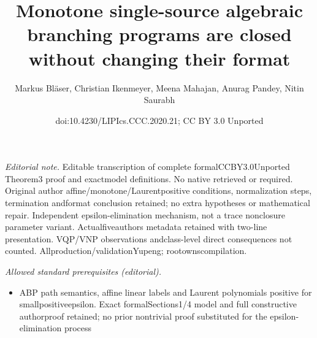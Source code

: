 \documentclass[10pt,a4paper]{article}
\title{Monotone single-source algebraic branching programs are closed without changing their format}
\author{Markus Bläser, Christian Ikenmeyer, Meena Mahajan, Anurag Pandey, Nitin Saurabh}
\date{doi:10.4230/LIPIcs.CCC.2020.21; CC BY 3.0 Unported}
\begin{document}
\maketitle
\noindent\textit{Editorial note.} Editable transcription of complete formalCCBY3.0Unported Theorem3 proof and exactmodel definitions. No native retrieved or required. Original author affine/monotone/Laurentpositive conditions, normalization steps, termination andformat conclusion retained; no extra hypotheses or mathematical repair. Independent epsilon-elimination mechanism, not a trace nonclosure parameter variant. Actualfiveauthors metadata retained with two-line presentation. VQP/VNP observations andclass-level direct consequences not counted. Allproduction/validationYupeng; rootownscompilation.\par\medskip
\noindent\textit{Allowed standard prerequisites (editorial).}\begin{itemize}
\item ABP path semantics, affine linear labels and Laurent polynomials positive for smallpositiveepsilon. Exact formalSections1/4 model and full constructive authorproof retained; no prior nontrivial proof substituted for the epsilon-elimination process
\end{itemize}\medskip
\end{document}
